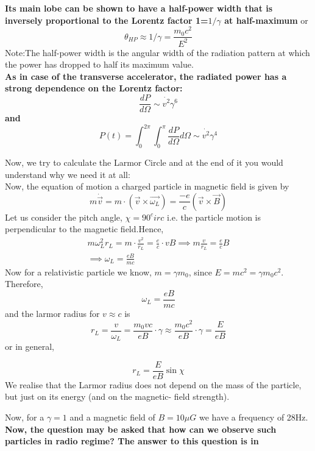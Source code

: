 \documentclass[12pt]{report}
\newcommand{\de}[2]{\frac{d{#1}}{d{#2}}}
\newcommand{\cbox}{tcolorbox}
\newcommand{\vd}[1]{\dot{\vec{#1}}}
\begin{document}
\textbf{Its main lobe can be shown to have a half-power width that is inversely proportional to the Lorentz factor 1=$1/\gamma$ at half-maximum} or 
\begin{equation}
\theta_{HP}\approx 1/\gamma =\frac{m_0c^2}{E^2}
\end{equation}
Note:The half-power width is the angular width of the radiation  pattern at which the power has dropped to half its maximum value.\\
\textbf{As in case of the transverse accelerator, the radiated power has a strong dependence on the Lorentz factor:
\begin{equation}
\de{P}{\Omega} \sim \dot{v^2}\gamma^6
\end{equation}
and
\begin{equation}
P(t)=\int^{2 \pi} _{0}\int^{ \pi} _{0} \de{P}{\Omega} d\Omega \sim \dot{v^2}\gamma^4
\end{equation}
}

Now, we try to calculate the Larmor Circle and at the end of it you would understand why we need it at all:\\
Now, the equation of motion a charged particle in magnetic field is given by
\begin{equation}
m\vd{v}=m\cdot (\vec{v}\times \vec{\omega_L})=\frac{-e}{c}(\vec{v}\times \vec{B})
\end{equation}
Let us consider the pitch angle, $\chi=90^circ$ i.e. the particle motion is perpendicular to the magnetic field.Hence,
\begin{eqnarray}
m\omega^2_Lr_L=m\cdot \frac{v^2}{r_L}=\frac{e}{c} \cdot vB
\implies m\frac{v}{r_L}=\frac{e}{c} B\\
\implies \omega_L=\frac{eB}{mc}
\end{eqnarray}
Now for a relativistic particle we know, $m=\gamma m_0$, since $E=mc^2=\gamma m_0c^2$. Therefore,
\begin{equation}
\omega_L=\frac{eB}{mc}
\end{equation}
and the larmor radius for $v\approx c$ is
\begin{equation}
r_L=\frac{v}{\omega_L}=\frac{m_0vc}{eB}\cdot \gamma\approx \frac{m_0c^2}{eB}\cdot \gamma =\frac{E}{eB}
\end{equation}
or in general,
\begin{\cbox}
\begin{equation}
r_L=\frac{E}{eB}\sin \chi
\end{equation}
We realise that the Larmor radius does not depend on the mass of the particle, but just on its energy (and on the magnetic- field strength). 
\end{\cbox}
Now, for a $\gamma=1$ and a magnetic field of $B=10\mu G$ we have a frequency of 28Hz. 
\textbf{Now, the question may be asked that how can we observe such particles in radio regime? The answer to this question is in}
\end{document}
